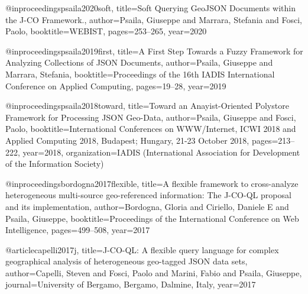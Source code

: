 @inproceedings{psaila2020soft,
  title={Soft Querying GeoJSON Documents within the J-CO Framework.},
  author={Psaila, Giuseppe and Marrara, Stefania and Fosci, Paolo},
  booktitle={WEBIST},
  pages={253--265},
  year={2020}
}

@inproceedings{psaila2019first,
  title={A First Step Towards a Fuzzy Framework for Analyzing Collections of JSON Documents},
  author={Psaila, Giuseppe and Marrara, Stefania},
  booktitle={Proceedings of the 16th IADIS International Conference on Applied Computing},
  pages={19--28},
  year={2019}
}

@inproceedings{psaila2018toward,
  title={Toward an Anayist-Oriented Polystore Framework for Processing JSON Geo-Data},
  author={Psaila, Giuseppe and Fosci, Paolo},
  booktitle={International Conferences on WWW/Internet, ICWI 2018 and Applied Computing 2018, Budapest; Hungary, 21-23 October 2018},
  pages={213--222},
  year={2018},
  organization={IADIS (International Association for Development of the Information Society)}
}

@inproceedings{bordogna2017flexible,
  title={A flexible framework to cross-analyze heterogeneous multi-source geo-referenced information: The J-CO-QL proposal and its implementation},
  author={Bordogna, Gloria and Ciriello, Daniele E and Psaila, Giuseppe},
  booktitle={Proceedings of the International Conference on Web Intelligence},
  pages={499--508},
  year={2017}
}

@article{capelli2017j,
  title={J-CO-QL: A flexible query language for complex geographical analysis of heterogeneous geo-tagged JSON data sets},
  author={Capelli, Steven and Fosci, Paolo and Marini, Fabio and Psaila, Giuseppe},
  journal={University of Bergamo, Bergamo, Dalmine, Italy},
  year={2017}
}
